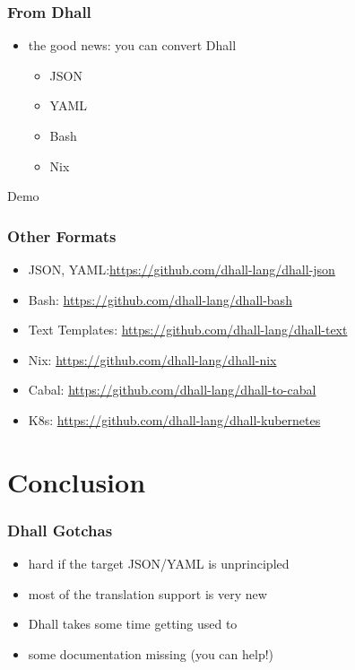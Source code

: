\documentclass{beamer}
\begin{document}
\begin{frame}
  \frametitle{From Dhall}
  \begin{itemize}
  \item the good news: you can convert Dhall
    \begin{itemize}
    \item JSON
    \item YAML
    \item Bash
    \item Nix
    \end{itemize}
  \end{itemize}
\end{frame}

\begin{frame}
  \begin{center}
    {\Huge Demo}
  \end{center}
\end{frame}

\begin{frame}
  \frametitle{Other Formats}
  \begin{itemize}
  \item JSON, YAML:\@ \url{https://github.com/dhall-lang/dhall-json}
  \item Bash: \url{https://github.com/dhall-lang/dhall-bash}
  \item Text Templates: \url{https://github.com/dhall-lang/dhall-text}
  \item Nix: \url{https://github.com/dhall-lang/dhall-nix}
  \item Cabal: \url{https://github.com/dhall-lang/dhall-to-cabal}
  \item K8s: \url{https://github.com/dhall-lang/dhall-kubernetes}
  \end{itemize}
\end{frame}

\section{Conclusion}

\begin{frame}
  \frametitle{Dhall Gotchas}
  \begin{itemize}
  \item hard if the target JSON/YAML is unprincipled
  \item most of the translation support is very new
  \item Dhall takes some time getting used to
  \item some documentation missing (you can help!)
  \end{itemize}
\end{frame}
\end{document}
